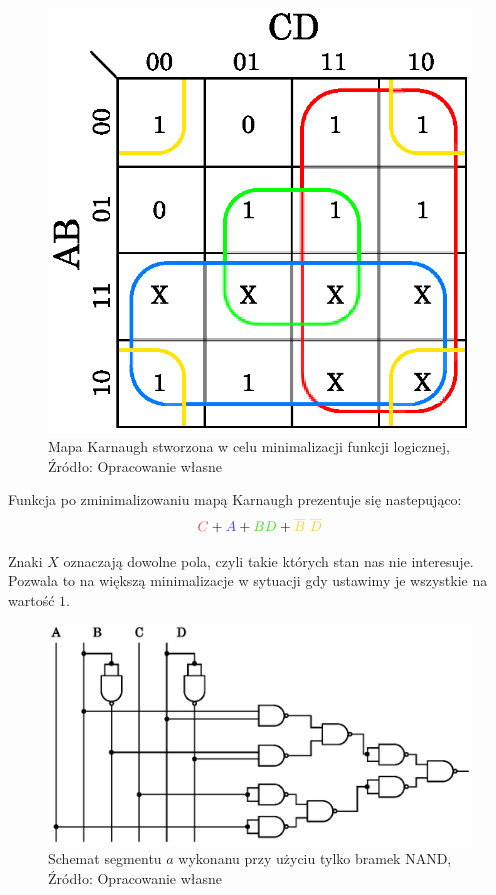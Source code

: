 \documentclass{article}
\begin{document}
\begin{figure}[!ht]
\begin{minipage}{.5\textwidth}
          \includegraphics[scale=0.65]{grafiki/K_map_segment_a.eps}
          \caption{Mapa Karnaugh stworzona w celu minimalizacji funkcji logicznej,
          \\Źródło: Opracowanie własne}
        \end{minipage}
      \end{figure}

      Funkcja po zminimalizowaniu mapą Karnaugh prezentuje się nastepująco: \\
      \begin{equation}
        \textcolor{red}{C} + \textcolor{blue}{A} + \textcolor{green}{BD} + \textcolor{yellow}{\overline{B}\ \overline{D}}
      \end{equation}

      Znaki $X$ oznaczają dowolne pola, czyli takie których stan nas nie interesuje. Pozwala to na większą minimalizacje w sytuacji gdy ustawimy je wszystkie na wartość $1$.

      \begin{figure}[!ht]
        \centering
        \includegraphics[scale=0.65]{grafiki/schemat_segment_a.eps}
        \caption{Schemat segmentu $a$ wykonanu przy użyciu tylko bramek NAND,
        \\Źródło: Opracowanie własne}
      \end{figure}
      \pagebreak
\end{document}
